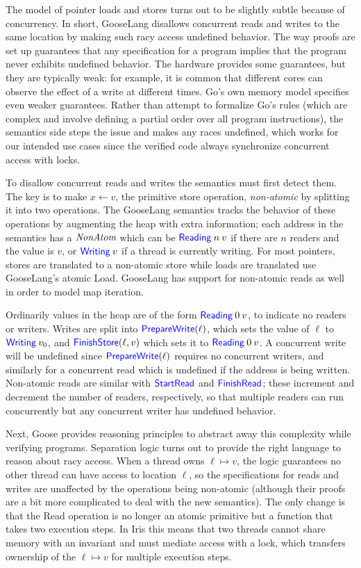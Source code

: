 The model of pointer loads and stores turns out to be slightly subtle because of
concurrency. In
short, GooseLang disallows concurrent reads and writes to the same
location by making such racy access undefined behavior. The way proofs are set
up guarantees that any
specification for a program implies that the
program never exhibits undefined behavior. The hardware provides some
guarantees, but they are typically weak: for example, it is common that different cores
can observe the effect of a write at different times. Go's own memory model specifies
even weaker guarantees. Rather than attempt to formalize Go's rules
(which are complex and involve defining a partial order over all program
instructions), the semantics side steps the issue and makes any races undefined,
which works for our intended use cases since the verified code always synchronize
concurrent access with locks.

To disallow concurrent reads and writes the semantics must first detect them. The key is to make
$x \gets v$, the primitive store operation, \emph{non-atomic} by splitting it
into two operations. The GooseLang semantics tracks the behavior of these
operations by augmenting the heap with extra information; each address in the
semantics has a $\textit{NonAtom}$ which can be
$\mathsf{\textcolor{blue}{Reading}} \: n \: v$ if there are $n$ readers and the value is $v$,
or $\mathsf{\textcolor{blue}{Writing}} \: v$ if a thread is currently writing. For most
pointers, stores are translated to a non-atomic store while loads are translated
use GooseLang's atomic Load. GooseLang has support for non-atomic
reads as well in order to model map iteration.

Ordinarily values in the heap are of the form $\mathsf{\textcolor{blue}{Reading}} \: 0 \: v$,
to indicate no readers or writers. Writes are split into
$\mathsf{\textcolor{blue}{PrepareWrite}}(\ell)$, which sets the value of $\ell$ to
$\mathsf{\textcolor{blue}{Writing}} \: v_{0}$, and $\mathsf{\textcolor{blue}{FinishStore}}(\ell, v)$ which sets
it to $\mathsf{\textcolor{blue}{Reading}} \: 0 \: v$. A concurrent write will be undefined
since $\mathsf{\textcolor{blue}{PrepareWrite}}(\ell)$ requires no concurrent writers, and
similarly for a concurrent read which is undefined if the address is being
written. Non-atomic reads are similar with $\mathsf{\textcolor{blue}{StartRead}}$ and
$\mathsf{\textcolor{blue}{FinishRead}}$; these increment and decrement the number of readers,
respectively, so that multiple readers can run concurrently but any concurrent
writer has undefined behavior.

Next, Goose provides reasoning principles to abstract away this complexity while
verifying programs. Separation logic turns out to provide the right
language to reason about racy access. When a thread owns
$\ell \mapsto v$, the logic guarantees no other thread can have access to location
$\ell$, so the specifications for reads and writes are unaffected by the
operations being non-atomic (although their proofs are a bit more
complicated to deal with the new semantics). The only change is that the
Read operation is no longer an atomic primitive but a function that
takes two execution steps. In Iris this means that two threads cannot
share memory with an invariant and must mediate access with a lock,
which transfers ownership of the $\ell \mapsto v$ for multiple execution
steps.

